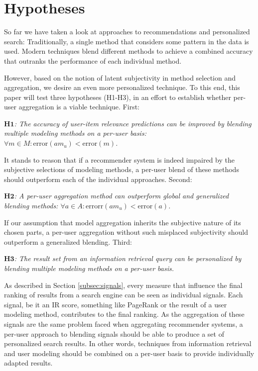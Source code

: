 \section{Hypotheses}

So far we have taken a look at approaches to recommendations and personalized search:
Traditionally, a single method that considers some pattern in the data is used.
Modern techniques blend different methods to achieve a combined accuracy 
that outranks the performance of each individual method.

However, based on the notion of latent subjectivity in method selection and aggregation,
we desire an even more personalized technique. 
To this end, this paper will test three hypotheses (H1-H3), in an effort to establish
whether per-user aggregation is a viable technique. First:

{
  \itshape
  $\mathbf{H1}$: The accuracy of user-item relevance predictions can be improved
  by blending multiple modeling methods on a per-user basis:
  $\forall m \in M: \mathrm{error}(am_u) < \mathrm{error}(m)$.
}

It stands to reason that if a recommender system is indeed impaired
by the subjective selections of modeling methods,
a per-user blend of these methods should outperform each of the individual approaches.
Second:

{
  \itshape
  $\mathbf{H2}$: A per-user aggregation method can outperform global and generalized 
  blending methods:
  $\forall a \in A: \mathrm{errorr}(am_u) < \mathrm{error}(a)$.
}

If our assumption that model aggregation inherits the subjective nature of its chosen parts,
a per-user aggregation without such misplaced subjectivity should outperform a
generalized blending.
Third:

{
  \itshape
  $\mathbf{H3}$: The result set from an information retrieval query
  can be personalized by blending multiple modeling methods on a per-user basis.
}

As described in Section \ref{subsec:signals},
every measure that influence the final ranking of results from a search engine
can be seen as individual signals. Each signal, be it an IR score,
something like PageRank or the result of a user modeling method,
contributes to the final ranking.
As the aggregation of these signals are the same problem faced
when aggregating recommender systems,
a per-user approach to blending signals should be able to
produce a set of personalized search results.
In other words, techniques from information retrieval and user modeling
should be combined on a per-user basis to provide individually adapted results.

